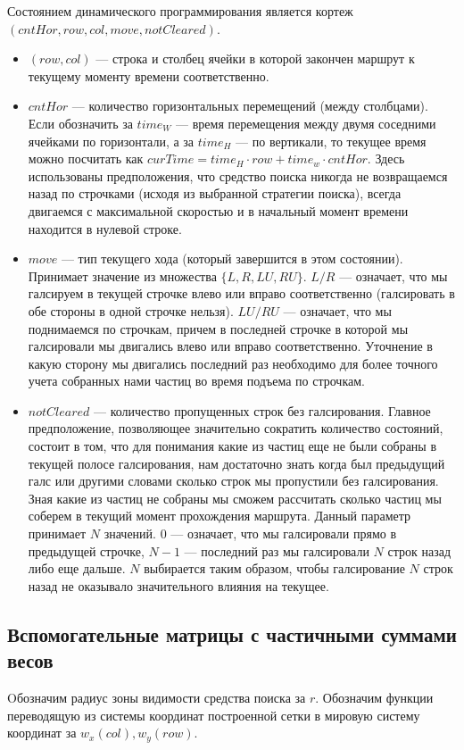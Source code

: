 Состоянием динамического программирования является кортеж $(cntHor, row, col, move, notCleared)$.
\begin{itemize}
\item $(row, col)$ --- строка и столбец ячейки в которой закончен маршрут к текущему моменту времени
соответственно.
\item $cntHor$ --- количество горизонтальных перемещений (между столбцами). Если обозначить
за $time_W$ --- время перемещения между двумя соседними ячейками по горизонтали, а за $time_H$ ---
по вертикали, то текущее время можно посчитать как $curTime = time_H \cdot row + time_w \cdot cntHor$.
Здесь использованы предположения, что средство поиска никогда не возвращаемся назад по строчками
(исходя из выбранной стратегии поиска), всегда двигаемся с максимальной скоростью и в начальный
момент времени находится в нулевой строке.
\item $move$ --- тип текущего хода (который завершится в этом состоянии). Принимает значение 
из множества $\{L, R, LU, RU\}$. $L/R$ --- означает, что мы галсируем в текущей строчке влево или
вправо соответственно (галсировать  в обе стороны в одной строчке нельзя). 
$LU/RU$ --- означает, что мы поднимаемся по строчкам, причем в последней строчке в которой мы
галсировали мы двигались влево или вправо соответственно. Уточнение в какую сторону мы двигались
последний раз необходимо для более точного учета собранных нами частиц во время подъема по строчкам.
\item $notCleared$ --- количество пропущенных строк без галсирования. Главное предположение,
позволяющее значительно сократить количество состояний, состоит в том, что для понимания
какие из частиц еще не были собраны в текущей полосе галсирования,
нам достаточно знать когда был предыдущий галс или другими словами сколько строк мы пропустили без
галсирования. Зная какие из частиц не собраны мы сможем рассчитать сколько частиц мы соберем
в текущий момент прохождения маршрута. Данный параметр принимает $N$ значений. $0$ --- означает,
что мы галсировали прямо в предыдущей строчке, $N-1$ --- последний раз мы галсировали $N$ строк
назад либо еще дальше. $N$ выбирается таким образом, чтобы галсирование $N$ строк назад
не оказывало значительного влияния на текущее.
\end{itemize}

\subsection{Вспомогательные матрицы с частичными суммами весов}
Oбозначим радиус зоны видимости средства поиска за $r$. Обозначим функции переводящую
из системы координат построенной сетки в мировую систему координат за $w_x(col), w_y(row)$.

